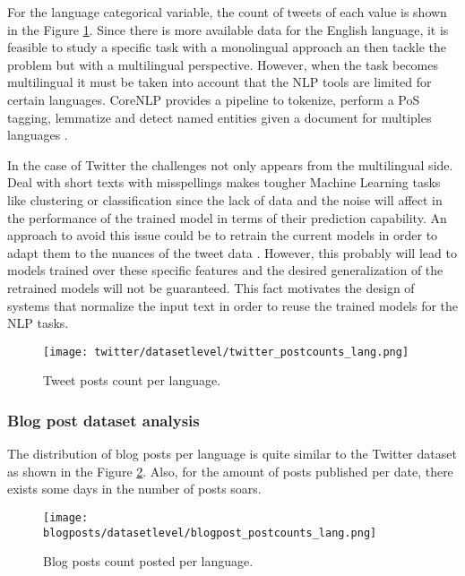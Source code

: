 \par For the language categorical variable, the count of tweets of each value is shown in the Figure \ref{fig:twitter_postcounts_lang}. Since there is more available data for the English language, it is feasible to study a specific task with a monolingual approach an then tackle the problem but with a multilingual perspective. However, when the task becomes multilingual it must be taken into account that the NLP tools are limited for certain languages. CoreNLP provides a pipeline to tokenize, perform a PoS tagging, lemmatize and detect named entities given a document for multiples languages \citep{coreNlp}. 
\par In the case of Twitter the challenges not only appears from the multilingual side. Deal with short texts with misspellings makes tougher Machine Learning tasks like clustering or classification since the lack of data and the noise will affect in the performance of the trained model in terms of their prediction capability. An approach to avoid this issue could be to retrain the current models in order to adapt them to the nuances of the tweet data \citep{synthesisLecturesSocial}. However, this probably will lead to models trained over these specific features and the desired generalization of the retrained models will not be guaranteed. This fact motivates the design of systems that normalize the input text in order to reuse the trained models for the NLP tasks.
\begin{figure}[H]
	\begin{center}
		\texttt{[image: twitter/datasetlevel/twitter\_postcounts\_lang.png]}
		\caption{Tweet posts count per language.}
		\label{fig:twitter_postcounts_lang}
	\end{center}
\end{figure}
\subsubsection{Blog post dataset analysis}
The distribution of blog posts per language is quite similar to the Twitter dataset as shown in the Figure \ref{fig:blogpost_postcounts_lang}. Also, for the amount of posts published per date, there exists some days in the number of posts soars.
\begin{figure}[H]
	\begin{center}
		\texttt{[image: blogposts/datasetlevel/blogpost\_postcounts\_lang.png]}
		\caption{Blog posts count posted per language.}
		\label{fig:blogpost_postcounts_lang}
	\end{center}
\end{figure}


